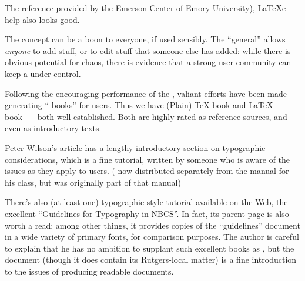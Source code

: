The reference provided by the Emerson Center of Emory
University), %
\href{http://www.emerson.emory.edu/services/latex/latex2e/latex2e_toc.html}{LaTeXe help}
also looks good.
\begin{ctanrefs}
\item[\nothtml{\rmfamily}Cheat sheet]
\item[\nothtml{\rmfamily}LaTeX reference manual]
\item[\nothtml{\rmfamily}LaTeX internal macros]
\end{ctanrefs}


The \emph{} concept can be a boon to everyone, if used sensibly.
The ``general''  allows \emph{anyone} to add stuff, or to edit
stuff that someone else has added: while there is obvious potential
for chaos, there is evidence that a strong user community can keep a
 under control.

Following the encouraging performance of the %
\href{http://contextgarden.net/}{\CONTeXT{} }, valiant
efforts have been made generating `` books'' for \AllTeX{}
users.  Thus we have %
\href{http://en.wikibooks.org/wiki/TeX}{(Plain) \TeX{}  book} and 
\href{http://en.wikibooks.org/wiki/LaTeX}{\LaTeX{}  book}~---
both well established.  Both are highly rated as reference sources,
and even as introductory texts.


Peter Wilson's article  has a lengthy introductory
section on typographic considerations, which is a fine tutorial,
written by someone who is aware of the issues as they apply to
\AllTeX{} users.  ( now distributed separately from
the manual for his  class, but was originally part of
that manual)

There's also (at least one) typographic style tutorial available on
the Web, the excellent %
``\href*{http://www.nbcs.rutgers.edu/~hedrick/typography/typography.janson-syntax.107514.pdf}{Guidelines for Typography in NBCS}''.
In fact, its %
\href*{http://www.nbcs.rutgers.edu/~hedrick/typography/index.html}{parent page}
is also worth a read: among other things, it provides copies of the
``guidelines'' document in a wide variety of primary fonts, for
comparison purposes.  The author is careful to explain that he has no
ambition to supplant such excellent books as
, but the document (though it does
contain its Rutgers-local matter) is a fine introduction to the issues
of producing readable documents.
\begin{ctanrefs}
\item[memdesign]
\end{ctanrefs}


